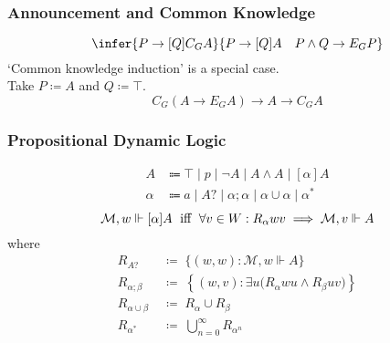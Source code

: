 \documentclass[UTF8,aspectratio=43,11pt,colorlinks,compress,openany]{beamer}%
\begin{document}
\begin{frame}\frametitle{Announcement and Common Knowledge}
\[\infer{P\to[Q]C_GA}{P\to[Q]A\quad P\wedge Q\to E_GP}\]
`Common knowledge induction' is a special case.\\
Take $P\coloneqq A$ and $Q\coloneqq \top$.
\[C_G(A\to E_GA)\to A\to C_GA\]
\end{frame}

\begin{frame}\frametitle{Propositional Dynamic Logic}
\begin{align*}
 A&\Coloneqq \top\mid p\mid \neg A\mid A\wedge A\mid [\alpha]A\\
\alpha&\Coloneqq a\mid A?\mid \alpha;\alpha\mid\alpha\cup\alpha\mid\alpha^*
\end{align*}
\[\mathcal{M},w\Vdash[\alpha]A \mbox{\; iff \;} \forall v\in W: R_\alpha wv\implies\mathcal{M},v\Vdash A\]
where
\begin{align*}
R_{A?}&\;\coloneqq \;\{(w,w): \mathcal{M},w\Vdash A\}\\
R_{\alpha;\beta}&\;\coloneqq \;\left\{(w,v):\exists u\big(R_{\alpha}wu\wedge R_{\beta}uv\big)\right\}\\
R_{\alpha\cup\beta}&\;\coloneqq \;R_{\alpha}\cup R_{\beta}\\
R_{\alpha^*}&\;\coloneqq \;\bigcup\limits_{n=0}^\infty R_{\alpha^n}
\end{align*}
\end{frame}
\end{document}
